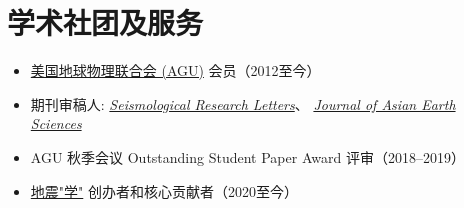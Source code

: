 \section{学术社团及服务}

\begin{itemize}
\item \href{https://sites.agu.org/}{美国地球物理联合会 (AGU)} 会员（2012至今）
\item 期刊审稿人:
      \textit{\href{https://pubs.geoscienceworld.org/srl/}{Seismological Research Letters}}、
      \textit{\href{https://www.journals.elsevier.com/journal-of-asian-earth-sciences/}{Journal of Asian Earth Sciences}}
\item AGU 秋季会议 Outstanding Student Paper Award 评审（2018--2019）
\item \href{https://seismo-learn.org/}{地震"学"} 创办者和核心贡献者（2020至今）
\end{itemize}

